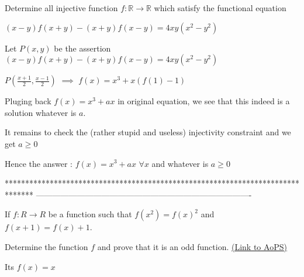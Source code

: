 \begin{solution}
	\begin{tcolorbox}Determine all injective function  $f : \mathbb{R} \rightarrow \mathbb{R}$ which satisfy the functional equation 

$(x - y)f(x+y) - (x+y)f(x-y) = 4xy(x^2-y^2)$\end{tcolorbox}
Let $P(x,y)$ be the assertion $(x-y)f(x+y)-(x+y)f(x-y)=4xy(x^2-y^2)$

$P(\frac{x+1}2,\frac {x-1}2)$ $\implies$ $f(x)=x^3+x(f(1)-1)$

Pluging back $f(x)=x^3+ax$ in original equation, we see that this indeed is a solution whatever is $a$.

It remains to check the (rather stupid and useless) injectivity constraint and we get $a\ge 0$

Hence the answer : $\boxed{f(x)=x^3+ax}$ $\forall x$ and whatever is $a\ge 0$
\end{solution}
*******************************************************************************
-------------------------------------------------------------------------------

\begin{problem}
	If $f:R\rightarrow R$ be a function such that $f(x^2)=f(x)^2$ and $f(x+1)=f(x)+1$.

Determine the function $f$ and prove that it is an odd function.
	\flushright \href{https://artofproblemsolving.com/community/c6h484819}{(Link to AoPS)}
\end{problem}



\begin{solution}
	Its $\boxed{f(x)=x}$
\end{solution}



